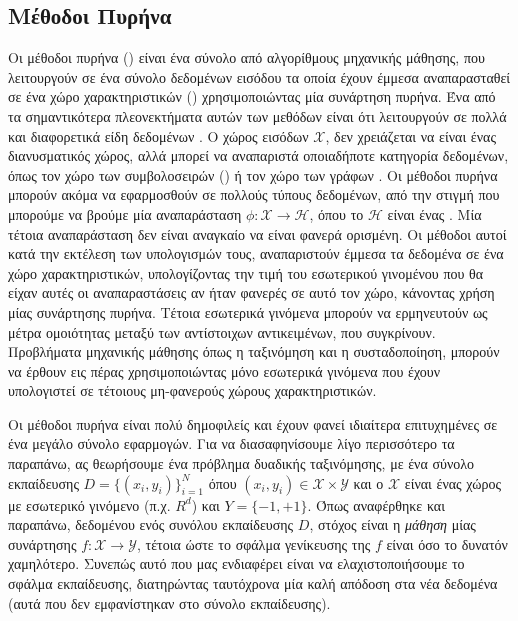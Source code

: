 \subsection{Μέθοδοι Πυρήνα}
Οι μέθοδοι πυρήνα () είναι ένα σύνολο από αλγορίθμους μηχανικής μάθησης, που λειτουργούν σε ένα σύνολο δεδομένων εισόδου τα οποία έχουν έμμεσα αναπαρασταθεί σε ένα χώρο χαρακτηριστικών () χρησιμοποιώντας μία συνάρτηση πυρήνα.
Ένα από τα σημαντικότερα πλεονεκτήματα αυτών των μεθόδων είναι ότι λειτουργούν σε πολλά και διαφορετικά είδη δεδομένων \cite{ScholkopfSmolaLK}.
Ο χώρος εισόδων $\mathcal{X}$, δεν χρειάζεται να είναι ένας διανυσματικός χώρος, αλλά μπορεί να αναπαριστά οποιαδήποτε κατηγορία δεδομένων, όπως τον χώρο των συμβολοσειρών () ή τον χώρο των γράφων \cite{GartnerSKSD}.
Οι μέθοδοι πυρήνα μπορούν ακόμα να εφαρμοσθούν σε πολλούς τύπους δεδομένων, από την στιγμή που μπορούμε να βρούμε μία αναπαράσταση $\phi : \mathcal{X} \rightarrow \mathcal{H}$, όπου το $\mathcal{H}$ είναι ένας .
Μία τέτοια αναπαράσταση δεν είναι αναγκαίο να είναι φανερά ορισμένη.
Οι μέθοδοι αυτοί κατά την εκτέλεση των υπολογισμών τους, αναπαριστούν έμμεσα τα δεδομένα σε ένα χώρο χαρακτηριστικών, υπολογίζοντας την τιμή του εσωτερικού γινομένου που θα είχαν αυτές οι αναπαραστάσεις αν ήταν φανερές σε αυτό τον χώρο, κάνοντας χρήση μίας συνάρτησης πυρήνα.
Τέτοια εσωτερικά γινόμενα μπορούν να ερμηνευτούν ως μέτρα ομοιότητας μεταξύ των αντίστοιχων αντικειμένων, που συγκρίνουν.
Προβλήματα μηχανικής μάθησης όπως η ταξινόμηση και η συσταδοποίηση, μπορούν να έρθουν εις πέρας χρησιμοποιώντας μόνο εσωτερικά γινόμενα που έχουν υπολογιστεί σε τέτοιους μη-φανερούς χώρους χαρακτηριστικών.\par
Οι μέθοδοι πυρήνα είναι πολύ δημοφιλείς και έχουν φανεί ιδιαίτερα επιτυχημένες σε ένα μεγάλο σύνολο εφαρμογών.
Για να διασαφηνίσουμε λίγο περισσότερο τα παραπάνω, ας θεωρήσουμε ένα πρόβλημα δυαδικής ταξινόμησης, με ένα σύνολο εκπαίδευσης $D = \{( x_{i}, y_{i})\}^{Ν}_{i = 1}$ όπου $(x_{i}, y_{i}) \in \mathcal{X} \times \mathcal{Y}$ και ο $\mathcal{X}$ είναι ένας χώρος με εσωτερικό γινόμενο (π.χ. $R^{d}$) και $Y = \{-1, +1\}$.
Όπως αναφέρθηκε και παραπάνω, δεδομένου ενός συνόλου εκπαίδευσης $D$, στόχος είναι η \textit{μάθηση} μίας συνάρτησης $f : \mathcal{X} \rightarrow \mathcal{Y}$, τέτοια ώστε το σφάλμα γενίκευσης της $f$ είναι όσο το δυνατόν χαμηλότερο.
Συνεπώς αυτό που μας ενδιαφέρει είναι να ελαχιστοποιήσουμε το σφάλμα εκπαίδευσης, διατηρώντας ταυτόχρονα μία καλή απόδοση στα νέα δεδομένα (αυτά που δεν εμφανίστηκαν στο σύνολο εκπαίδευσης).
